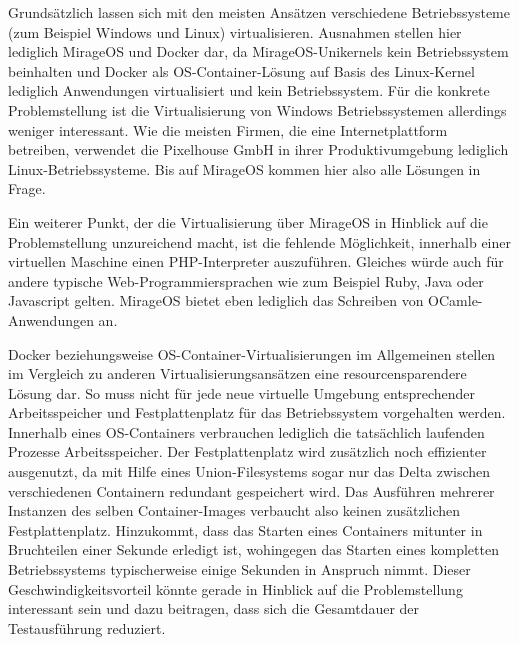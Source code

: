Grundsätzlich lassen sich mit den meisten Ansätzen verschiedene Betriebssysteme (zum Beispiel Windows und Linux) virtualisieren. Ausnahmen stellen hier lediglich MirageOS und Docker dar, da MirageOS-Unikernels kein Betriebssystem beinhalten und Docker als OS-Container-Lösung auf Basis des Linux-Kernel lediglich Anwendungen virtualisiert und kein Betriebssystem. Für die konkrete Problemstellung ist die Virtualisierung von Windows Betriebssystemen allerdings weniger interessant. Wie die meisten Firmen, die eine Internetplattform betreiben, verwendet die Pixelhouse GmbH in ihrer Produktivumgebung lediglich Linux-Betriebssysteme. Bis auf MirageOS kommen hier also alle Lösungen in Frage.

Ein weiterer Punkt, der die Virtualisierung über MirageOS in Hinblick auf die Problemstellung unzureichend macht, ist die fehlende Möglichkeit, innerhalb einer virtuellen Maschine einen PHP-Interpreter auszuführen. Gleiches würde auch für andere typische Web-Programmiersprachen wie zum Beispiel Ruby, Java oder Javascript gelten. MirageOS bietet eben lediglich das Schreiben von OCamle-Anwendungen an.

Docker beziehungsweise OS-Container-Virtualisierungen im Allgemeinen stellen im Vergleich zu anderen Virtualisierungsansätzen eine resourcensparendere Lösung dar. So muss nicht für jede neue virtuelle Umgebung entsprechender Arbeitsspeicher und Festplattenplatz für das Betriebssystem vorgehalten werden. Innerhalb eines OS-Containers verbrauchen lediglich die tatsächlich laufenden Prozesse Arbeitsspeicher. Der Festplattenplatz wird zusätzlich noch effizienter ausgenutzt, da mit Hilfe eines Union-Filesystems sogar nur das Delta zwischen verschiedenen Containern redundant gespeichert wird. Das Ausführen mehrerer Instanzen des selben Container-Images verbaucht also keinen zusätzlichen Festplattenplatz. Hinzukommt, dass das Starten eines Containers mitunter in Bruchteilen einer Sekunde erledigt ist, wohingegen das Starten eines kompletten Betriebssystems typischerweise einige Sekunden in Anspruch nimmt. Dieser Geschwindigkeitsvorteil könnte gerade in Hinblick auf die Problemstellung interessant sein und dazu beitragen, dass sich die Gesamtdauer der Testausführung reduziert.

